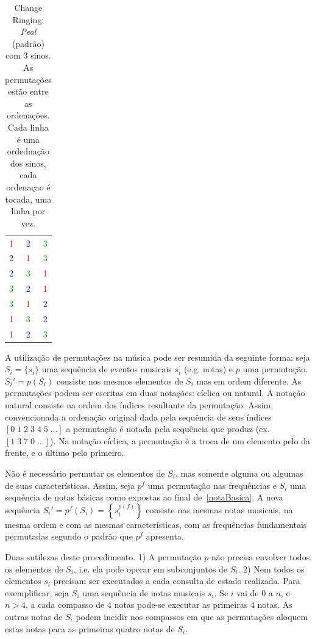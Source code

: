 \begin{table}[htpq!]
\centering
\caption{Change Ringing: \emph{Peal} (padrão) com 3 sinos. As permutações estão entre as ordenações. Cada linha é uma ordednação dos sinos, cada ordenaçao é tocada, uma linha por vez.}
\begin{tabular}{l c r}
\textcolor{red}{1} & \textcolor{blue}{2} & \textcolor{green}{3} \\
\textcolor{blue}{2} & \textcolor{red}{1} & \textcolor{green}{3} \\
\textcolor{blue}{2} & \textcolor{green}{3} & \textcolor{red}{1} \\
\textcolor{green}{3} & \textcolor{blue}{2} & \textcolor{red}{1} \\
\textcolor{green}{3} & \textcolor{red}{1} & \textcolor{blue}{2} \\
\textcolor{red}{1} & \textcolor{green}{3} & \textcolor{blue}{2} \\
\textcolor{red}{1} & \textcolor{blue}{2} & \textcolor{green}{3}
\end{tabular}
\label{tab:change}
\end{table}


A utilização de permutações na música pode ser resumida da seguinte forma:
seja $S_i=\{s_i\}$ uma sequência de eventos musicais $s_i$ (e.g. notas) e $p$ uma permutação.
$S_i'=p(S_i)$ consiste nos mesmos elementos de $S_i$ mas em ordem diferente.
As permutações podem ser escritas em duas notações: cíclica ou natural. 
A notação natural consiste na ordem dos índices 
resultante da permutação. Assim,
convencionada a ordenação original dada pela sequência de seus índices $[0\;1\;2\;3\;4\;5\;...]$ a permutação é notada pela sequência que produz (ex. $[1\;3\;7\;0\;...]$). Na notação cíclica, a permutação é a troca de um elemento pelo
da frente, e o último pelo primeiro.

Não é necessário permutar os elementos de $S_i$, mas somente
alguma ou algumas de suas características. Assim, seja $p^f$ uma permutação 
nas frequências e $S_i$ uma sequência de notas básicas como expostas
ao final de~\ref{notaBasica}. A nova sequência $S_i'=p^f(S_i)=\left\{s_i^{p(f)}\right\}$ consiste nas mesmas
notas musicais, na mesma ordem e com as mesmas características, com as frequências fundamentais permutadas segundo o padrão que $p^f$ apresenta.

Duas sutilezas deste procedimento.
1) A permutação $p$ não precisa envolver todos os elementos de $S_i$, i.e. ela
pode operar em subconjuntos de $S_i$. 2) Nem todos os elementos $s_i$ precisam ser executados a cada consulta de estado realizada.
Para exemplificar, seja $S_i$ 
uma sequência de notas musicais $s_i$. 
Se $i$ vai de $0$ a $n$, e $n>4$, a cada compasso
de $4$ notas pode-se executar as primeiras $4$ notas. As outras notas de
$S_i$ podem incidir nos compassos em que as permutações aloquem
estas notas para as primeiras quatro notas de $S_i$.

